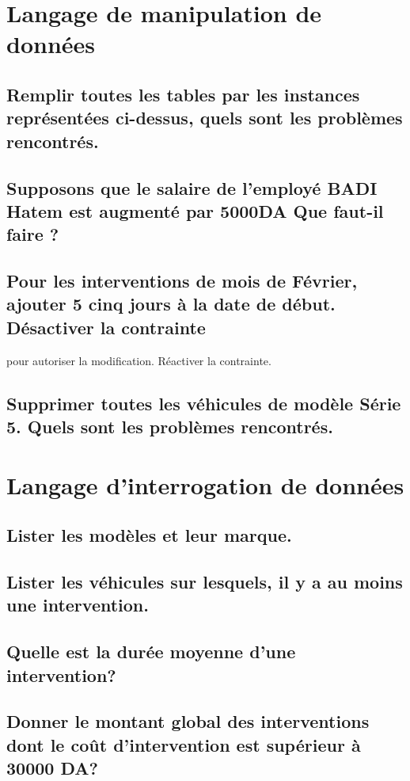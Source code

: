 \documentclass[•]{article}
\begin{document}
\section{Langage de manipulation de données}
\subsection{Remplir toutes les tables par les instances représentées ci-dessus, quels sont les problèmes rencontrés.}
\subsection{Supposons que le salaire de l’employé BADI Hatem est augmenté par 5000DA Que faut-il faire ?}
\subsection{Pour les interventions de mois de Février, ajouter 5 cinq jours à la date de début. Désactiver la contrainte}
pour autoriser la modification. Réactiver la contrainte.
\subsection{Supprimer toutes les véhicules de modèle Série 5. Quels sont les problèmes rencontrés.}
\section{Langage d’interrogation de données}
\subsection{Lister les modèles et leur marque.}
\subsection{Lister les véhicules sur lesquels, il y a au moins une intervention.}
\subsection{Quelle est la durée moyenne d’une intervention?}
\subsection{Donner le montant global des interventions dont le coût d’intervention est supérieur à 30000 DA?}
\end{document}
